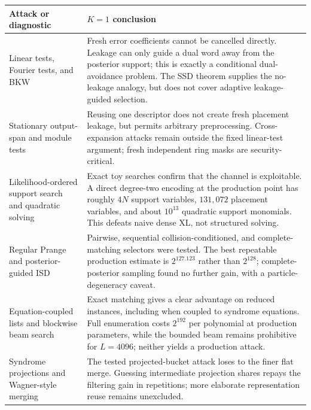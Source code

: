 \begin{table}[t]
\centering
\footnotesize
\begin{tabular}{p{}|p{}}
\toprule
Attack or diagnostic & $K=1$ conclusion \\
\midrule
Linear tests, Fourier tests, and BKW
& Fresh error coefficients cannot be cancelled directly.  Leakage can only
  guide a dual word away from the posterior support; this is exactly a
  conditional dual-avoidance problem.  The SSD theorem supplies the
  no-leakage analogy, but does not cover adaptive leakage-guided selection. \\

Stationary output-span and module tests
& Reusing one descriptor does not create fresh placement leakage, but permits
  arbitrary preprocessing.  Cross-expansion attacks remain outside the fixed
  linear-test argument; fresh independent ring masks are security-critical. \\

Likelihood-ordered support search and quadratic solving
& Exact toy searches confirm that the channel is exploitable.  A direct
  degree-two encoding at the production point has roughly $4N$ support
  variables, $131{,}072$ placement variables, and about $10^{13}$ quadratic
  support monomials.  This defeats naive dense XL, not structured solving. \\

Regular Prange and posterior-guided ISD
& Pairwise, sequential collision-conditioned, and complete-matching selectors
  were tested.  The best repeatable production estimate is $2^{127.123}$
  rather than $2^{128}$; complete-posterior sampling found no further gain,
  with a particle-degeneracy caveat. \\

Equation-coupled lists and blockwise beam search
& Exact matching gives a clear advantage on reduced instances, including when
  coupled to syndrome equations.  Full enumeration costs $2^{192}$ per
  polynomial at production parameters, while the bounded beam remains
  prohibitive for $L=4096$; neither yields a production attack. \\

Syndrome projections and Wagner-style merging
& The tested projected-bucket attack loses to the finer flat merge.  Guessing
  intermediate projection shares repays the filtering gain in repetitions;
  more elaborate representation reuse remains unexcluded. \\


\end{tabular}
\end{table}
